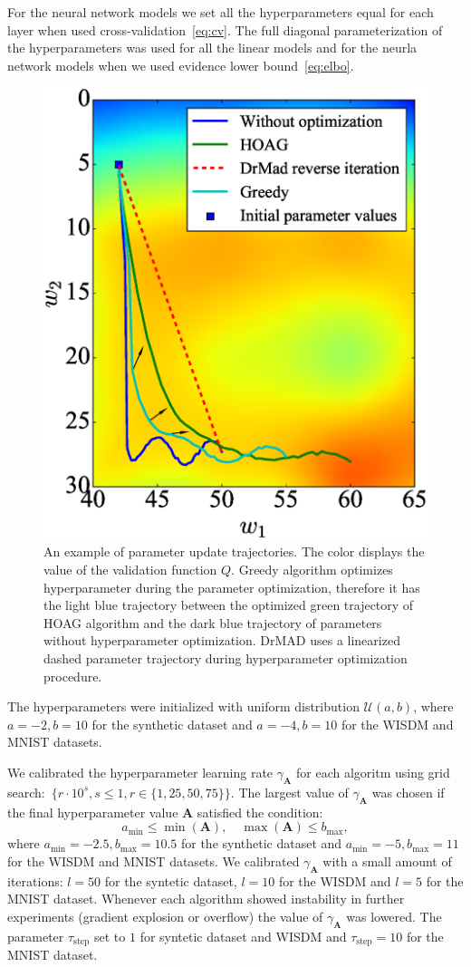 \documentclass[smallcondensed]{svjour3}
\begin{document}
For the neural network models we set all the hyperparameters equal for each layer when used  cross-validation~\eqref{eq:cv}. The full diagonal parameterization of the hyperparameters was used for all the linear models and for the neurla network models when we used evidence lower bound~\eqref{eq:elbo}.


\begin{figure}[tbh!]
    \centering
    \includegraphics[width=0.5\linewidth]{plots/Fig_traj.eps}

    \caption{An example of parameter update trajectories. The color displays the value of the validation function $Q$. Greedy algorithm optimizes hyperparameter during the parameter optimization, therefore it has the light blue trajectory between the optimized green trajectory of HOAG algorithm and the dark blue trajectory of parameters without hyperparameter optimization. DrMAD uses a linearized dashed parameter trajectory during hyperparameter optimization procedure.  }
    \end{figure}


The hyperparameters were initialized with uniform distribution $\mathcal{U}(a,b)$,
where $a = -2, b = 10$ for the synthetic dataset and $a = -4, b = 10$  for the WISDM and MNIST datasets.

We calibrated the hyperparameter learning rate $\gamma_{\mathbf{A}}$  for each algoritm using grid search:~$\{r \cdot 10^{s}, s \leq 1, r \in \{1,25,50,75\}\}$. The largest value of $\gamma_{\mathbf{A}}$ was chosen if the final hyperparameter value $\mathbf{A}$ satisfied the condition:
\[
    a_\text{min} \leq  \min(\mathbf{A}), \quad \max(\mathbf{A}) \leq b_\text{max},
\] 
where $a_\text{min} = -2.5, b_\text{max}=10.5$ for the synthetic dataset and $a_\text{min} = -5, b_\text{max}=11$ for the WISDM and MNIST datasets. We calibrated $\gamma_\mathbf{A}$ with a small amount of iterations: $l=50$ for the syntetic dataset, $l=10$ for the WISDM and $l=5$ for the MNIST dataset. Whenever each algorithm showed instability in further experiments (gradient explosion or overflow) the value of $\gamma_{\mathbf{A}}$ was lowered. The parameter $\tau_\text{step}$ set to $1$ for syntetic dataset and WISDM and  $\tau_\text{step}=10$ for the MNIST dataset.
\end{document}
